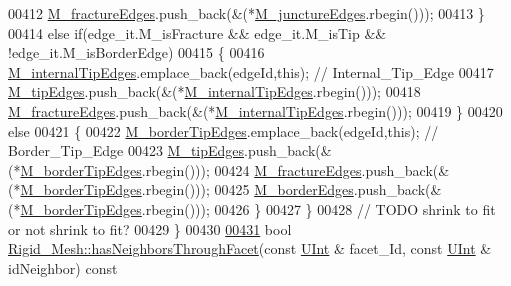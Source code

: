 \begin{DoxyCode}
00412             \hyperlink{classFVCode3D_1_1Rigid__Mesh_af4626d6b92116a3f6e925847f413da2b}{M\_fractureEdges}.push\_back(&(*\hyperlink{classFVCode3D_1_1Rigid__Mesh_a01850de43f4d5d1dcf617d7697bcf3e8}{M\_junctureEdges}.rbegin()));
00413         \}
00414         \textcolor{keywordflow}{else} \textcolor{keywordflow}{if}(edge\_it.M\_isFracture && edge\_it.M\_isTip && !edge\_it.M\_isBorderEdge)
00415         \{
00416             \hyperlink{classFVCode3D_1_1Rigid__Mesh_a15cb042bfb5d94c4ce34f20d1e92ebb5}{M\_internalTipEdges}.emplace\_back(edgeId,\textcolor{keyword}{this}); \textcolor{comment}{// Internal\_Tip\_Edge}
00417             \hyperlink{classFVCode3D_1_1Rigid__Mesh_a973940e6cd68e9980afec97fe94a70f4}{M\_tipEdges}.push\_back(&(*\hyperlink{classFVCode3D_1_1Rigid__Mesh_a15cb042bfb5d94c4ce34f20d1e92ebb5}{M\_internalTipEdges}.rbegin()));
00418             \hyperlink{classFVCode3D_1_1Rigid__Mesh_af4626d6b92116a3f6e925847f413da2b}{M\_fractureEdges}.push\_back(&(*\hyperlink{classFVCode3D_1_1Rigid__Mesh_a15cb042bfb5d94c4ce34f20d1e92ebb5}{M\_internalTipEdges}.rbegin()));
00419         \}
00420         \textcolor{keywordflow}{else}
00421         \{
00422             \hyperlink{classFVCode3D_1_1Rigid__Mesh_a712ea50f5237025e92af21799c5ec31b}{M\_borderTipEdges}.emplace\_back(edgeId,\textcolor{keyword}{this}); \textcolor{comment}{// Border\_Tip\_Edge}
00423             \hyperlink{classFVCode3D_1_1Rigid__Mesh_a973940e6cd68e9980afec97fe94a70f4}{M\_tipEdges}.push\_back(&(*\hyperlink{classFVCode3D_1_1Rigid__Mesh_a712ea50f5237025e92af21799c5ec31b}{M\_borderTipEdges}.rbegin()));
00424             \hyperlink{classFVCode3D_1_1Rigid__Mesh_af4626d6b92116a3f6e925847f413da2b}{M\_fractureEdges}.push\_back(&(*\hyperlink{classFVCode3D_1_1Rigid__Mesh_a712ea50f5237025e92af21799c5ec31b}{M\_borderTipEdges}.rbegin()));
00425             \hyperlink{classFVCode3D_1_1Rigid__Mesh_af9ba7882baec8f8e5e7693a38f3cbc9b}{M\_borderEdges}.push\_back(&(*\hyperlink{classFVCode3D_1_1Rigid__Mesh_a712ea50f5237025e92af21799c5ec31b}{M\_borderTipEdges}.rbegin()));
00426         \}
00427     \}
00428     \textcolor{comment}{// TODO shrink to fit or not shrink to fit?}
00429 \}
00430 
\hypertarget{RigidMesh_8cpp_source.tex_l00431}{}\hyperlink{classFVCode3D_1_1Rigid__Mesh_a816fca58143872612c89b46cb3bd01b3}{00431} \textcolor{keywordtype}{bool} \hyperlink{classFVCode3D_1_1Rigid__Mesh_a816fca58143872612c89b46cb3bd01b3}{Rigid\_Mesh::hasNeighborsThroughFacet}(\textcolor{keyword}{const} 
      \hyperlink{namespaceFVCode3D_a4bf7e328c75d0fd504050d040ebe9eda}{UInt} & facet\_Id, \textcolor{keyword}{const} \hyperlink{namespaceFVCode3D_a4bf7e328c75d0fd504050d040ebe9eda}{UInt} & idNeighbor)\textcolor{keyword}{ const}

\end{DoxyCode}
